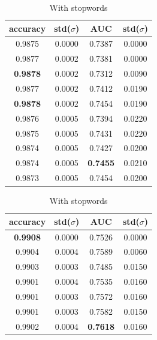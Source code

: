 \begin{table}
  \begin{subtable}{.5\linewidth}
    \centering
    \begin{tabular}{cccc} \toprule
      accuracy        & std($\sigma$) & AUC             & std($\sigma$) \\ \midrule
      0.9875          & 0.0000        & 0.7387          & 0.0000 \\
      0.9877          & 0.0002        & 0.7381          & 0.0000 \\
      \textbf{0.9878} & 0.0002        & 0.7312          & 0.0090 \\
      0.9877          & 0.0002        & 0.7412          & 0.0190 \\
      \textbf{0.9878} & 0.0002        & 0.7454          & 0.0190 \\ \midrule
      0.9876          & 0.0005        & 0.7394          & 0.0220 \\
      0.9875          & 0.0005        & 0.7431          & 0.0220 \\
      0.9874          & 0.0005        & 0.7427          & 0.0200 \\
      0.9874          & 0.0005        & \textbf{0.7455} & 0.0210 \\
      0.9873          & 0.0005        & 0.7454          & 0.0200 \\ \bottomrule
    \end{tabular}
      \caption{With stopwords}
      \label{tab:data-with-stopwords}
  \end{subtable}
  \begin{subtable}{.5\linewidth}
    \centering
    \begin{tabular}{cccc} \toprule
      accuracy        & std($\sigma$) & AUC             & std($\sigma$) \\ \midrule
      \textbf{0.9908} & 0.0000        & 0.7526          & 0.0000 \\
      0.9904          & 0.0004        & 0.7589          & 0.0060 \\
      0.9903          & 0.0003        & 0.7485          & 0.0150 \\
      0.9901          & 0.0004        & 0.7535          & 0.0160 \\
      0.9901          & 0.0003        & 0.7572          & 0.0160 \\ \midrule
      0.9901          & 0.0003        & 0.7582          & 0.0150 \\
      0.9902          & 0.0004        & \textbf{0.7618} & 0.0160 \\

\end{tabular}
\end{subtable}
\end{table}
